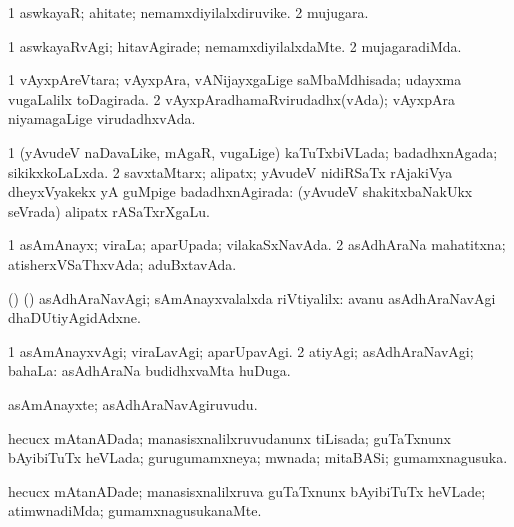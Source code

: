 \bentry
{} 
\gl{\nA}
\expl{}
\bmng
\bnum
\num{1} aswkayaR; ahitate; nemamxdiyilalxdiruvike. 
\num{2} mujugara. 
\enum
\emng
\eentry

\bentry
{} 
\gl{\kirxvi}
\expl{}
\bmng
\bnum
\num{1} aswkayaRvAgi; hitavAgirade; nemamxdiyilalxdaMte. 
\num{2} mujagaradiMda. 
\enum
\emng
\eentry

\bentry
{}
\gl{\gu}
\expl{}
\bmng
\bnum
\num{1} vAyxpAreVtara; vAyxpAra, vANijayxgaLige saMbaMdhisada; udayxma \mo vugaLalilx toDagirada. 
\num{2} vAyxpAradhamaRvirudadhx(vAda); vAyxpAra niyamagaLige virudadhxvAda. 
\enum
\emng
\eentry

\bentry
{} 
\gl{\gu}
\expl{}
\bmng
\bnum
\num{1} (yAvudeV naDavaLike, mAgaR, \mo vugaLige) kaTuTxbiVLada; badadhxnAgada; sikikxkoLaLxda. 
\num{2} savxtaMtarx; alipatx; yAvudeV nidiRSaTx rAjakiVya dheyxVyakekx yA guMpige badadhxnAgirada:  (yAvudeV shakitxbaNakUkx seVrada) alipatx rASaTxrXgaLu. 
\enum
\emng
\eentry

\bentry
{} 
\gl{\gu}
\expl{}
\bmng
\bnum
\num{1} asAmAnayx; viraLa; aparUpada; vilakaSxNavAda. 
\num{2} asAdhAraNa mahatitxna; atisherxVSaThxvAda; aduBxtavAda. 
\enum
\emng
\eentry

\bentry
{}
\gl{\kirxvi}
\expl{}
\bmng
 (\pArxparx) (\AmA) asAdhAraNavAgi; sAmAnayxvalalxda riVtiyalilx:  avanu asAdhAraNavAgi dhaDUtiyAgidAdxne. 
\emng
\eentry

\bentry
{} 
\gl{\kirxvi}
\expl{}
\bmng
\bnum
\num{1} asAmAnayxvAgi; viraLavAgi; aparUpavAgi. 
\num{2} atiyAgi; asAdhAraNavAgi; bahaLa:  asAdhAraNa budidhxvaMta huDuga. 
\enum
\emng
\eentry

\bentry
{} 
\gl{\nA}
\expl{}
\bmng
 asAmAnayxte; asAdhAraNavAgiruvudu. 
\emng
\eentry

\bentry
{} 
\gl{\gu}
\expl{}
\bmng
 hecucx mAtanADada; manasisxnalilxruvudanunx tiLisada; guTaTxnunx bAyibiTuTx heVLada; gurugumamxneya; mwnada; mitaBASi; gumamxnagusuka. 
\emng
\eentry

\bentry
{} 
\gl{\kirxvi}
\expl{}
\bmng
 hecucx mAtanADade; manasisxnalilxruva guTaTxnunx bAyibiTuTx heVLade; atimwnadiMda; gumamxnagusukanaMte. 
\emng
\eentry

